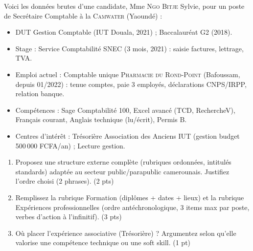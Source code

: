 \documentclass[11pt]{article}
\begin{document}
\begin{exercice}
Voici les données brutes d'une candidate, Mme \textsc{Ngo} \textsc{Bitje} Sylvie, pour un poste de Secrétaire Comptable à la \textsc{Camwater} (Yaoundé) :
\begin{itemize}
    \item DUT Gestion Comptable (IUT Douala, 2021) ; Baccalauréat G2 (2018).
    \item Stage : Service Comptabilité \textsc{SNEC} (3 mois, 2021) : saisie factures, lettrage, TVA.
    \item Emploi actuel : Comptable unique \og \textsc{Pharmacie du Rond-Point} \fg (Bafoussam, depuis 01/2022) : tenue comptes, paie 3 employés, déclarations CNPS/IRPP, relation banque.
    \item Compétences : Sage Comptabilité 100, Excel avancé (TCD, RechercheV), Français courant, Anglais technique (lu/écrit), Permis B.
    \item Centres d'intérêt : Trésorière Association des Anciens IUT (gestion budget 500\,000 FCFA/an) ; Lecture gestion.
\end{itemize}

\begin{enumerate}
    \item Proposez une structure externe complète (rubriques ordonnées, intitulés standards) adaptée au secteur public/parapublic camerounais. Justifiez l'ordre choisi (2 phrases). \hfill (2 pts)
    \item Remplissez la rubrique \og Formation \fg (diplômes + dates + lieux) et la rubrique \og Expériences professionnelles \fg (ordre antéchronologique, 3 items max par poste, verbes d'action à l'infinitif). \hfill (3 pts)
    \item Où placer l'expérience associative (Trésorière) ? Argumentez selon qu'elle valorise une compétence technique ou une soft skill. \hfill (1 pt)
\end{enumerate}
\end{exercice}
\end{document}
